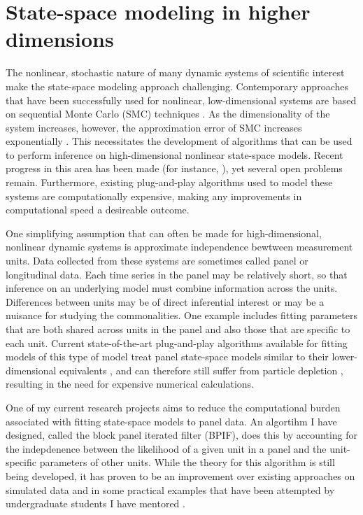 \documentclass{article}
\begin{document}

\section{State-space modeling in higher dimensions}\label{sec:methods}

The nonlinear, stochastic nature of many dynamic systems of scientific interest make the state-space modeling approach challenging.
Contemporary approaches that have been successfully used for nonlinear, low-dimensional systems are based on sequential Monte Carlo (SMC) techniques \cite{ionides06,andrieu10,ionides15}.
As the dimensionality of the system increases, however, the approximation error of SMC increases exponentially \cite{bengtsson08,snyder08}.
This necessitates the development of algorithms that can be used to perform inference on high-dimensional nonlinear state-space models.
Recent progress in this area has been made (for instance, \cite{ionides22,wheeler24}), yet several open problems remain.
Furthermore, existing plug-and-play algorithms used to model these systems are computationally expensive, making any improvements in computational speed a desireable outcome.

One simplifying assumption that can often be made for high-dimensional, nonlinear dynamic systems is approximate independence bewtween measurement units.
Data collected from these systems are sometimes called panel or longitudinal data.
Each time series in the panel may be relatively short, so that inference on an underlying model must combine information across the units.
Differences between units may be of direct inferential interest or may be a nuisance for studying the commonalities.
One example includes fitting parameters that are both shared across units in the panel and also those that are specific to each unit.
Current state-of-the-art plug-and-play algorithms available for fitting models of this type of model treat panel state-space models similar to their lower-dimensional equivalents \cite{breto20}, and can therefore still suffer from particle depletion \cite{snyder08}, resulting in the need for expensive numerical calculations.

One of my current research projects aims to reduce the computational burden associated with fitting state-space models to panel data.
An algortihm I have designed, called the block panel iterated filter (BPIF), does this by accounting for the indepdenence between the likelihood of a given unit in a panel and the unit-specific parameters of other units.
While the theory for this algorithm is still being developed, it has proven to be an improvement over existing approaches on simulated data and in some practical examples that have been attempted by undergraduate students I have mentored \cite{yang23,sun24}.
\end{document}
